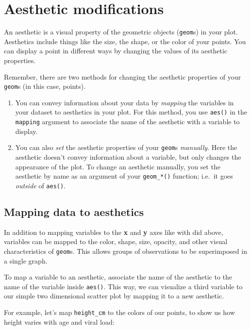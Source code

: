 \documentclass[
  letterpaper,
  DIV=11,
  numbers=noendperiod]{scrreprt}
\begin{document}
\section{Aesthetic modifications}\label{aesthetic-modifications}

An aesthetic is a visual property of the geometric objects
(\texttt{geom}s) in your plot. Aesthetics include things like the size,
the shape, or the color of your points. You can display a point in
different ways by changing the values of its aesthetic properties.

Remember, there are two methods for changing the aesthetic properties of
your \texttt{geom}s (in this case, points).

\begin{enumerate}
\def\labelenumi{\arabic{enumi}.}
\item
  You can convey information about your data by \emph{mapping} the
  variables in your dataset to aesthetics in your plot. For this method,
  you use \texttt{aes()} in the \texttt{mapping} argument to associate
  the name of the aesthetic with a variable to display.
\item
  You can also \emph{set} the aesthetic properties of your
  \texttt{geom}s \emph{manually}. Here the aesthetic doesn't convey
  information about a variable, but only changes the appearance of the
  plot. To change an aesthetic manually, you set the aesthetic by name
  as an argument of your \texttt{geom\_*()} function; i.e.~it goes
  \emph{outside} of \texttt{aes()}.
\end{enumerate}

\subsection{Mapping data to
aesthetics}\label{mapping-data-to-aesthetics}

In addition to mapping variables to the \textbf{x} and \textbf{y} axes
like with did above, variables can be mapped to the color, shape, size,
opacity, and other visual characteristics of \texttt{geom}s. This allows
groups of observations to be superimposed in a single graph.

To map a variable to an aesthetic, associate the name of the aesthetic
to the name of the variable inside \texttt{aes()}. This way, we can
visualize a third variable to our simple two dimensional scatter plot by
mapping it to a new aesthetic.

For example, let's map \texttt{height\_cm} to the colors of our points,
to show us how height varies with age and viral load:
\end{document}

